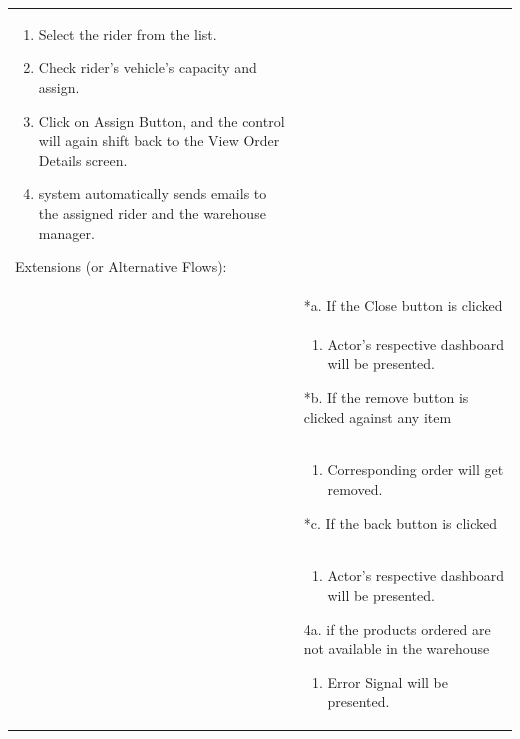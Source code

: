 \documentclass[12pt,a4paper]{article}
\begin{document}
\begin{longtable}{| p{3cm}|p{12cm}|}
\begin{enumerate}
\item Select the rider from the list.

\item Check rider's vehicle's capacity and assign.

\item Click on Assign Button, and the control will again shift back to the View Order Details screen.

\item system automatically sends emails to the assigned rider and the warehouse manager.

\end{enumerate}



Extensions (or Alternative Flows):\\

& *a. If the Close button is clicked \\

& \begin{enumerate}

		\item Actor's respective dashboard will be presented.

	\end{enumerate}

*b. If the remove button is clicked against any item\\

& \begin{enumerate}

		\item Corresponding order will get removed.

	\end{enumerate}

*c. If the back button is clicked\\

& \begin{enumerate}

		\item Actor's respective dashboard will be presented.

	\end{enumerate}

4a. if the products ordered are not available in the warehouse

 	\begin{enumerate}

		\item Error Signal will be presented.

	\end{enumerate}


\end{longtable}
\end{document}
